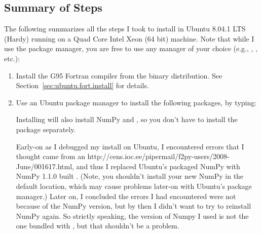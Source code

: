 \subsection{Summary of Steps}      \label{sec:ubuntu.install.summary}

The following summarizes all the steps I took to install
 in
Ubuntu 8.04.1 LTS (Hardy) running on a
Quad Core Intel Xeon (64 bit) machine.
Note that while I use the  package manager, you are
free to use any manager of your choice (e.g., ,
, etc.):

\begin{enumerate}
\item Install the G95 Fortran compiler from the binary distribution.
	See Section~\ref{sec:ubuntu.fort.install} for details.

\item Use an Ubuntu package manager
	to install the following packages, by typing:
	\begin{codeblock}
	\end{codeblock}

	Installing  will also install NumPy and
	, so you don't have to install the
	 package separately.

	Early-on as I debugged my  install on Ubuntu,
	I encountered errors that I thought came from an 
		{http://cens.ioc.ee/pipermail/f2py-users/2008-June/001617.html},
	and thus I replaced Ubuntu's packaged NumPy with NumPy 1.1.0
	built 
		{.}
	(Note, you shouldn't install your new NumPy in the default
	location, which may cause problems later-on with Ubuntu's
	package manager.)
	Later on, I concluded the errors I had encountered were not
	because of the NumPy version, but by then I didn't want to
	try to reinstall NumPy again.
	So strictly speaking, the version of Numpy I used is not
	the one bundled with , but that shouldn't
	be a problem.


\end{enumerate}
